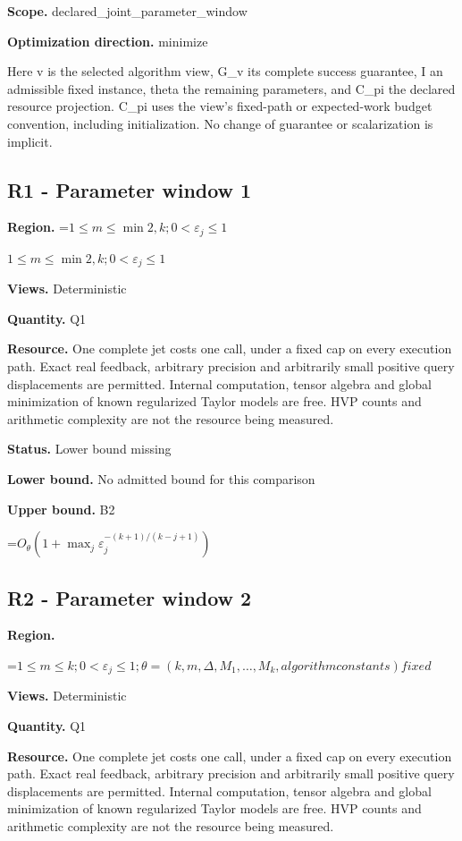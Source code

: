 \documentclass[10pt,a4paper]{article}
\newcommand{\AtlasMath}[1]{\par\begingroup\centering\setbox0=\hbox{$\displaystyle #1$}\ifdim\wd0>1.4\linewidth\typeout{ATLAS WIDE FORMULA: \the\wd0}\fi\ifdim\wd0>\linewidth\resizebox{\linewidth}{!}{\box0}\else\box0\fi\par\endgroup}
\newcommand{\AtlasInlineMath}[1]{\begingroup\setbox0=\hbox{$#1$}\ifdim\wd0>.4\linewidth\endgroup\AtlasMath{#1}\else\endgroup$#1$\fi}
\begin{document}
\textbf{Scope.} declared\_joint\_parameter\_window

\textbf{Optimization direction.} minimize

Here v is the selected algorithm view, G\_v its complete success guarantee, I an admissible fixed instance, theta the remaining parameters, and C\_pi the declared resource projection. C\_pi uses the view's fixed-path or expected-work budget convention, including initialization. No change of guarantee or scalarization is implicit.

\subsection{R1 - Parameter window 1}
\textbf{Region.} \AtlasInlineMath{1\le m\le \min{2,k};0<\varepsilon_j\le 1}

\textbf{Views.} Deterministic

\textbf{Quantity.} Q1

\textbf{Resource.} One complete jet costs one call, under a fixed cap on every execution path. Exact real feedback, arbitrary precision and arbitrarily small positive query displacements are permitted. Internal computation, tensor algebra and global minimization of known regularized Taylor models are free. HVP counts and arithmetic complexity are not the resource being measured.

\textbf{Status.} Lower bound missing

\textbf{Lower bound.} No admitted bound for this comparison

\textbf{Upper bound.} B2

\AtlasMath{O_\theta(1+\max_j \varepsilon_j^{-(k+1)/(k-j+1)})}
\subsection{R2 - Parameter window 2}
\textbf{Region.} 
\AtlasMath{1\le m\le k;0<\varepsilon_j\le 1;\theta=(k,m,\Delta,M_1,\ldots,M_k,algorithm constants) fixed}


\textbf{Views.} Deterministic

\textbf{Quantity.} Q1

\textbf{Resource.} One complete jet costs one call, under a fixed cap on every execution path. Exact real feedback, arbitrary precision and arbitrarily small positive query displacements are permitted. Internal computation, tensor algebra and global minimization of known regularized Taylor models are free. HVP counts and arithmetic complexity are not the resource being measured.
\end{document}
